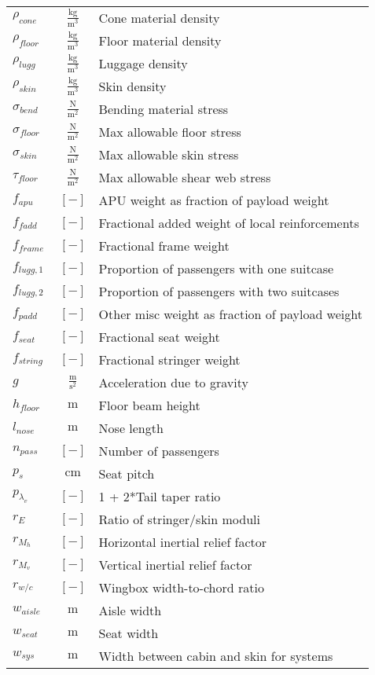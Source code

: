 {\begin{supertabular}{lcl}
$\rho_{cone}$ & $~\mathrm{\tfrac{kg}{m^{3}}}$ & Cone material density \\
$\rho_{floor}$ & $~\mathrm{\tfrac{kg}{m^{3}}}$ & Floor material density \\
$\rho_{lugg}$ & $~\mathrm{\tfrac{kg}{m^{3}}}$ & Luggage density \\
$\rho_{skin}$ & $~\mathrm{\tfrac{kg}{m^{3}}}$ & Skin density \\
$\sigma_{bend}$ & $~\mathrm{\tfrac{N}{m^{2}}}$ & Bending material stress \\
$\sigma_{floor}$ & $~\mathrm{\tfrac{N}{m^{2}}}$ & Max allowable floor stress \\
$\sigma_{skin}$ & $~\mathrm{\tfrac{N}{m^{2}}}$ & Max allowable skin stress \\
$\tau_{floor}$ & $~\mathrm{\tfrac{N}{m^{2}}}$ & Max allowable shear web stress \\
$f_{apu}$ & $~[-]$ & APU weight as fraction of payload weight \\
$f_{fadd}$ & $~[-]$ & Fractional added weight of local reinforcements \\
$f_{frame}$ & $~[-]$ & Fractional frame weight \\
$f_{lugg,1}$ & $~[-]$ & Proportion of passengers with one suitcase \\
$f_{lugg,2}$ & $~[-]$ & Proportion of passengers with two suitcases \\
$f_{padd}$ & $~[-]$ & Other misc weight as fraction of payload weight \\
$f_{seat}$ & $~[-]$ & Fractional seat weight \\
$f_{string}$ &  $~[-]$  & Fractional stringer weight \\
$g$ & $~\mathrm{\tfrac{m}{s^{2}}}$ & Acceleration due to gravity \\
$h_{floor}$ & $~\mathrm{m}$ & Floor beam height \\
$l_{nose}$ & $~\mathrm{m}$ & Nose length \\
$n_{pass}$ & $~[-]$ & Number of passengers\\	
$p_s$ & $~\mathrm{cm}$ & Seat pitch \\
$p_{\lambda_v}$ & $~[-]$ & 1 + 2*Tail taper ratio \\
$r_E$ & $~[-]$ & Ratio of stringer/skin moduli \\
$r_{M_h}$ & $~[-]$ & Horizontal inertial relief factor \\
$r_{M_v}$ & $~[-]$ & Vertical inertial relief factor \\
$r_{w/c}$ & $~[-]$ & Wingbox width-to-chord ratio \\
$w_{aisle}$ & $~\mathrm{m}$ & Aisle width \\
$w_{seat}$ & $~\mathrm{m}$ & Seat width \\
$w_{sys}$ & $~\mathrm{m}$ & Width between cabin and skin for systems \\
\bottomrule
\end{supertabular}}

% 
